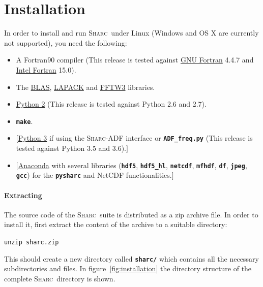\documentclass[a4paper,10pt,DIV=15,openany]{scrbook}
\newcommand{\link}[2]{\href{#1}{#2}}
\newcommand{\sharc}{\textsc{Sharc}}
\newcommand{\ttt}[1]{\textbf{\texttt{#1}}}
\newenvironment{example}{
  \setlength{\OuterFrameSep}{3pt}
  \vspace{0mm}
  \definecolor{shadecolor}{HTML}{E4F4FF}
  \begin{shaded}
}{
  \end{shaded}
}
\begin{document}
{\begin{shaded}
\begin{enumerate}
\end{enumerate}

\end{shaded}
}


\section{Installation}

In order to install and run \sharc\ under Linux (Windows and OS X are currently not supported), you need the following:
\begin{itemize}
  \item A Fortran90 compiler (This release is tested against \link{https://gcc.gnu.org/fortran/}{GNU Fortran} 4.4.7 and \link{https://software.intel.com/en-us/fortran-compilers}{Intel Fortran} 15.0).
  \item The \link{http://www.netlib.org/blas/}{BLAS}, \link{http://www.netlib.org/lapack/}{LAPACK} and \link{http://http://www.fftw.org/}{FFTW3} libraries.
  \item \link{https://www.python.org/downloads/release/python-2716/}{Python 2} (This release is tested against Python 2.6 and 2.7).
  \item \ttt{make}.
  \item $[$\link{https://www.python.org/downloads/release/python-374/}{Python 3} if using the \sharc-ADF interface or \ttt{ADF\_freq.py} (This release is tested against Python 3.5 and 3.6).$]$
  \item $[$\link{https://www.anaconda.com/distribution/}{Anaconda} with several libraries (\ttt{hdf5}, \ttt{hdf5\_hl}, \ttt{netcdf}, \ttt{mfhdf}, \ttt{df}, \ttt{jpeg}, \ttt{gcc}) for the \ttt{pysharc} and NetCDF functionalities.$]$
\end{itemize}

\paragraph{Extracting}

The source code of the  \sharc\ suite is distributed as a zip archive file. In order to install it, first extract the content of the archive to a suitable directory:
\begin{example}
\verb|unzip sharc.zip|
\end{example}
This should create a new directory called \ttt{sharc/} which contains all the necessary subdirectories and files. 
In figure~\ref{fig:installation} the directory structure of the complete \sharc\ directory is shown.
\end{document}
